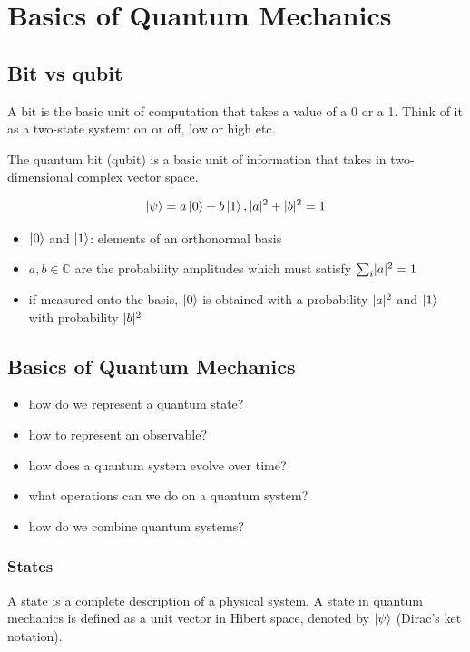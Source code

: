 \documentclass[11pt]{article}
\DeclarePairedDelimiter\abs{\lvert}{\rvert}
\begin{document}
\section{Basics of Quantum Mechanics}

\subsection{Bit vs qubit}

A bit is the basic unit of computation that takes a value of a 0 or a 1. Think of it as a two-state system: on or off, low or high etc.

The quantum bit (qubit) is a basic unit of information that takes in two-dimensional complex vector space.

\begin{equation*}
	\ket{\psi} = a\ket{0} + b\ket{1}, \abs{a}^2 + \abs{b}^2 = 1
\end{equation*}

\begin{itemize}
	\item $\ket{0}$ and $\ket{1}$: elements of an orthonormal basis
	\item $a, b \in \mathbb{C}$ are the probability amplitudes which must satisfy $\sum_i \abs{a}^2 = 1$
	\item if measured onto the basis, $\ket{0}$ is obtained with a probability $\abs{a}^2$ and $\ket{1}$ with probability $\abs{b}^2$
\end{itemize}

\subsection{Basics of Quantum Mechanics}

\begin{itemize}
	\item how do we represent a quantum state?
	\item how to represent an observable?
	\item how does a quantum system evolve over time?
	\item what operations can we do on a quantum system?
	\item how do we combine quantum systems?
\end{itemize}

\subsubsection{States}
A state is a complete description of a physical system. A state in quantum mechanics is defined as a unit vector in Hibert space, denoted by $\ket{\psi}$ (Dirac's ket notation).
\end{document}
